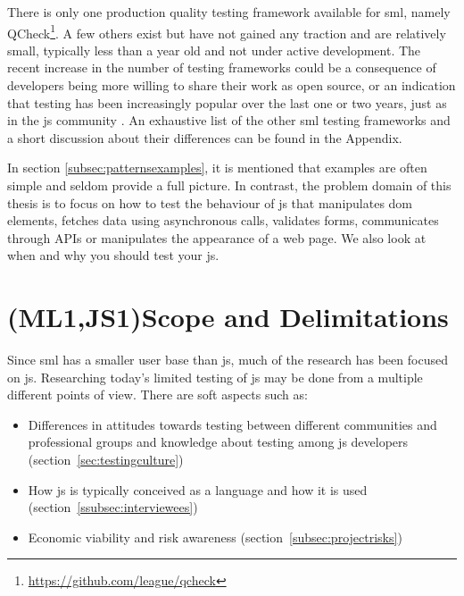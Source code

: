 \documentclass[11pt]{article}
\begin{document}
There is only one production quality testing framework available for \gls{sml}, namely QCheck\footnote{\url{https://github.com/league/qcheck}}. A few others exist but have not gained any traction and are relatively small, typically less than a year old and not under active development. The recent increase in the number of testing frameworks could be a consequence of developers being more willing to share their work as open source, or an indication that testing has been increasingly popular over the last one or two years, just as in the \gls{js} community \cite[question~1]{Edelstam}. An exhaustive list of the other \gls{sml} testing frameworks and a short discussion about their differences can be found in the Appendix.
\label{mltestingframeworks}

In section \ref{subsec:patternsexamples}, it is mentioned that examples are often simple and seldom provide a full picture. In contrast, the problem domain of this thesis is to focus on how to test the behaviour of \gls{js} that manipulates \gls{dom} elements, fetches data using asynchronous calls, validates forms, communicates through APIs or manipulates the appearance of a web page. We also look at when and why you should test your \gls{js}.

\section{(ML1,JS1)Scope and Delimitations}

Since \gls{sml} has a smaller user base than \gls{js}, much of the research has been focused on \gls{js}. Researching today's limited testing of \gls{js} may be done from a multiple different points of view. There are soft aspects such as:
\begin{itemize}[label={--}]
\item Differences in attitudes towards testing between different communities and professional groups and knowledge about testing among \gls{js} developers (section~\ref{sec:testingculture})
\item How \gls{js} is typically conceived as a language and how it is used (section~\ref{ssubsec:interviewees})
\item Economic viability and risk awareness (section~\ref{subsec:projectrisks})
\end{itemize}
\end{document}
